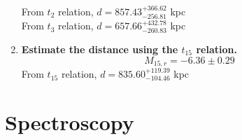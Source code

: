 \documentclass{article}
\begin{document}
\begin{enumerate}
		From \(t_2\) relation, \(d = 857.43^{+366.62}_{-256.81} \) kpc \\
		From \(t_3\) relation, \(d = 657.66^{+432.78}_{-260.83}\) kpc \\

		\item \textbf{Estimate the distance using the \(t_{15}\) relation.}\\
		\[M_{15,r} = -6.36 \pm 0.29\]
		From \(t_{15}\) relation, \(d = 835.60^{+119.39}_{-104.46}\) kpc \\

	\end{enumerate}

	\clearpage
	
	\section{Spectroscopy}
\end{document}
